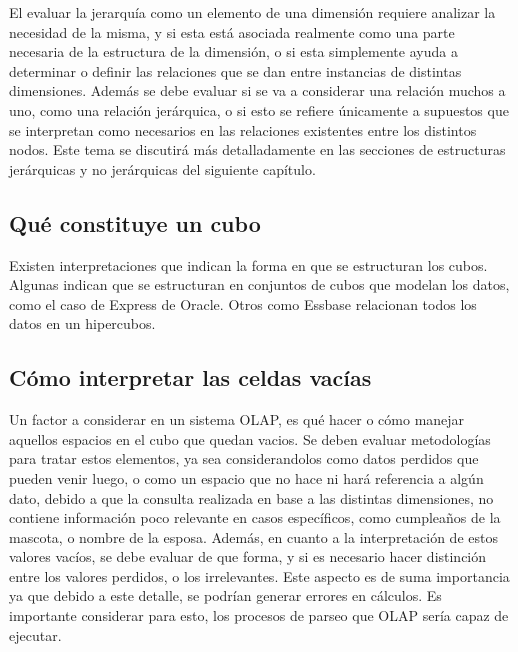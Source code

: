 \documentclass[DIV=calc, paper=a4, fontsize=11pt, twocolumn]{scrartcl}	 %
\begin{document}
El evaluar la jerarqu\'{i}a como un elemento de una dimensi\'{o}n requiere analizar la necesidad de la misma, y si esta est\'{a} asociada realmente como  una parte necesaria de la estructura de la dimensi\'{o}n, o si esta simplemente ayuda a determinar o definir las relaciones  que se dan entre  instancias de distintas dimensiones. Adem\'{a}s se debe evaluar si se va a considerar una relaci\'{o}n muchos a uno, como una relaci\'{o}n jer\'{a}rquica, o si esto se refiere \'{u}nicamente a supuestos que se interpretan como necesarios en las relaciones existentes entre los distintos nodos. Este tema se discutir\'{a} más detalladamente en las secciones de estructuras jer\'{a}rquicas y no jer\'{a}rquicas del siguiente cap\'{i}tulo.


\subsection*{Qu\'{e} constituye un cubo}

Existen interpretaciones que indican la forma en que se estructuran los cubos. Algunas indican que se estructuran en conjuntos de cubos que modelan los datos, como el caso de Express de Oracle. Otros como Essbase relacionan todos los datos en un hipercubos.


\subsection*{C\'{o}mo interpretar las celdas vac\'{i}as}

Un factor a considerar en un sistema OLAP, es qu\'{e} hacer o c\'{o}mo manejar aquellos espacios en el cubo que quedan vacios. Se deben evaluar metodolog\'{i}as  para tratar estos elementos, ya sea considerandolos como datos perdidos que pueden venir luego, o como un espacio que no hace ni har\'{a} referencia a alg\'{u}n dato, debido a que la consulta realizada en base a las distintas dimensiones, no contiene informaci\'{o}n poco relevante en casos espec\'{i}ficos, como cumplea\~{n}os de la mascota, o nombre de la esposa. Adem\'{a}s, en cuanto a la interpretaci\'{o}n de estos valores vac\'{i}os, se debe evaluar de que forma, y si es necesario hacer distinci\'{o}n entre los valores perdidos, o los irrelevantes.
Este aspecto es de suma importancia ya que debido a este detalle, se podr\'{i}an generar errores en c\'{a}lculos. Es importante considerar para esto, los procesos de parseo que OLAP ser\'{i}a capaz de ejecutar.
\end{document}
